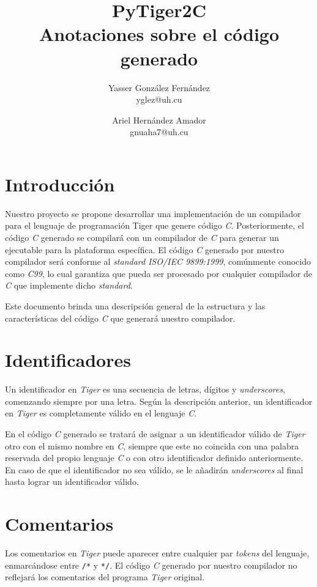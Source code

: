 \documentclass{article}
\title{
    \LARGE{PyTiger2C} \\
    \Large{Anotaciones sobre el código generado}
}
\author{
    Yasser González Fernández \\
    \small{yglez@uh.cu}
    \and
    Ariel Hernández Amador \\
    \small{gnuaha7@uh.cu}
}
\date{}
\begin{document}
\maketitle

\thispagestyle{empty}

\newpage

\setcounter{page}{1}

\section{Introducción}

Nuestro proyecto se propone desarrollar una implementación de un compilador para
el lenguaje de programación Tiger que genere código \emph{C}. Posteriormente, el
código \emph{C} generado se compilará con un compilador de \emph{C} para generar
un ejecutable para la plataforma específica. El código \emph{C} generado por
nuestro compilador será conforme al \emph{standard} \emph{ISO/IEC 9899:1999},
comúnmente conocido como \emph{C99}, lo cual garantiza que pueda ser procesado
por cualquier compilador de \emph{C} que implemente dicho \emph{standard}.

Este documento brinda una descripción general de la estructura y las
características del código \emph{C} que generará nuestro compilador.

\section{Identificadores}

Un identificador en \textit{Tiger} es una secuencia de letras, dígitos y
\textit{underscores}, comenzando siempre por una letra. Según la descripción
anterior, un identificador en \textit{Tiger} es completamente válido en el
lenguaje \textit{C}.

En el código \textit{C} generado se tratará de asignar a un identificador
válido de \textit{Tiger} otro con el mismo nombre en \textit{C}, siempre que
este no coincida con una palabra reservada del propio lenguaje \textit{C} o con
otro identificador definido anteriormente. En caso de que el identificador no
sea válido, se le añadirán \textit{underscores} al final hasta lograr un
identificador válido.

\section{Comentarios}

Los comentarios en \textit{Tiger} puede aparecer entre cualquier par
\textit{tokens} del lenguaje, enmarcándose entre \texttt{/*} y \texttt{*/}. El
código \textit{C} generado por nuestro compilador no reflejará los comentarios
del programa \textit{Tiger} original.
\end{document}
